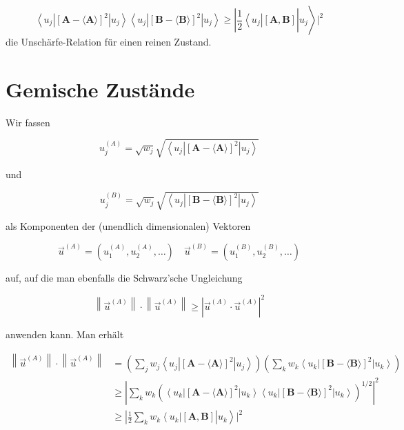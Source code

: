 \documentclass[10pt, letterpaper]{article}
\begin{document}
$$
\left.\left\langle u_{j}\right|[\mathbf{A}-\langle\mathbf{A}\rangle]^{2}\left|u_{j}\right\rangle\left\langle u_{j}\right|[\mathbf{B}-\langle\mathbf{B}\rangle]^{2}\left|u_{j}\right\rangle \geq\left|\frac{1}{2}\left\langle u_{j}\right|[\mathbf{A}, \mathbf{B}]\right| u_{j}\right\rangle\left.\right|^{2}
$$
die Unschärfe-Relation für einen reinen Zustand.

\section*{Gemische Zustände}
Wir fassen

$$
u_{j}^{(A)}=\sqrt{w_{j}} \sqrt{\left\langle u_{j}\right|[\mathbf{A}-\langle\mathbf{A}\rangle]^{2}\left|u_{j}\right\rangle}
$$

und

$$
u_{j}^{(B)}=\sqrt{w_{j}} \sqrt{\left\langle u_{j}\right|[\mathbf{B}-\langle\mathbf{B}\rangle]^{2}\left|u_{j}\right\rangle}
$$

als Komponenten der (unendlich dimensionalen) Vektoren

$$
\vec{u}^{(A)}=\left(u_{1}^{(A)}, u_{2}^{(A)}, \ldots\right) \quad \vec{u}^{(B)}=\left(u_{1}^{(B)}, u_{2}^{(B)}, \ldots\right)
$$

auf, auf die man ebenfalls die Schwarz'sche Ungleichung

$$
\left\|\vec{u}^{(A)}\right\| \cdot\left\|\vec{u}^{(A)}\right\| \geq\left|\vec{u}^{(A)} \cdot \vec{u}^{(A)}\right|^{2}
$$

anwenden kann. Man erhält

$$
\begin{aligned}
\left\|\vec{u}^{(A)}\right\| \cdot\left\|\vec{u}^{(A)}\right\| & =\left(\sum_{j} w_{j}\left\langle u_{j}\right|[\mathbf{A}-\langle\mathbf{A}\rangle]^{2}\left|u_{j}\right\rangle\right)\left(\sum_{k} w_{k}\left\langle u_{k}\right|[\mathbf{B}-\langle\mathbf{B}\rangle]^{2}\left|u_{k}\right\rangle\right) \\
& \geq\left|\sum_{k} w_{k}\left(\left\langle u_{k}\right|[\mathbf{A}-\langle\mathbf{A}\rangle]^{2}\left|u_{k}\right\rangle\left\langle u_{k}\right|[\mathbf{B}-\langle\mathbf{B}\rangle]^{2}\left|u_{k}\right\rangle\right)^{1 / 2}\right|^{2} \\
& \left.\geq\left|\frac{1}{2} \sum_{k} w_{k}\left\langle u_{k}\right|[\mathbf{A}, \mathbf{B}]\right| u_{k}\right\rangle\left.\right|^{2}
\end{aligned}
$$
\end{document}
